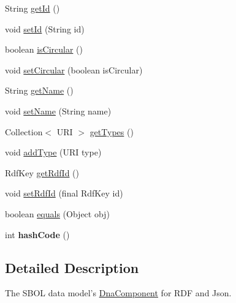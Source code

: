\begin{DoxyCompactItemize}
\item 
String \hyperlink{classorg_1_1sbolstandard_1_1lib_s_b_o_lj_1_1_dna_component_aa851daaf10426c9a42044ca1a7fe8060}{getId} ()
\item 
void \hyperlink{classorg_1_1sbolstandard_1_1lib_s_b_o_lj_1_1_dna_component_aea61027e5c308a8200c07d76d0f597b1}{setId} (String id)
\item 
boolean \hyperlink{classorg_1_1sbolstandard_1_1lib_s_b_o_lj_1_1_dna_component_ae8ce8039c52384b14ce23f816e7181d4}{isCircular} ()
\item 
void \hyperlink{classorg_1_1sbolstandard_1_1lib_s_b_o_lj_1_1_dna_component_a6534e208dd1b57a6610afb9d26eb68fa}{setCircular} (boolean isCircular)
\item 
String \hyperlink{classorg_1_1sbolstandard_1_1lib_s_b_o_lj_1_1_dna_component_acb8e59ea7c54aa9a3412564784ccaa7e}{getName} ()
\item 
void \hyperlink{classorg_1_1sbolstandard_1_1lib_s_b_o_lj_1_1_dna_component_af3da1d3c7be4ae6bd71fc20145d1db05}{setName} (String name)
\item 
Collection$<$ URI $>$ \hyperlink{classorg_1_1sbolstandard_1_1lib_s_b_o_lj_1_1_dna_component_ab7c26db2517c03db394cd08a628e1d9d}{getTypes} ()
\item 
void \hyperlink{classorg_1_1sbolstandard_1_1lib_s_b_o_lj_1_1_dna_component_a9c98ced4a045dbdf60d4c09f1025df9a}{addType} (URI type)
\item 
RdfKey \hyperlink{classorg_1_1sbolstandard_1_1lib_s_b_o_lj_1_1_dna_component_a2f954d1f82194a78433acc5f73191267}{getRdfId} ()
\item 
void \hyperlink{classorg_1_1sbolstandard_1_1lib_s_b_o_lj_1_1_dna_component_a8995b319c63119db4d42589bd2083b19}{setRdfId} (final RdfKey id)
\item 
boolean \hyperlink{classorg_1_1sbolstandard_1_1lib_s_b_o_lj_1_1_dna_component_a247353c297008cbcd2b134068c9659de}{equals} (Object obj)
\item 
\hypertarget{classorg_1_1sbolstandard_1_1lib_s_b_o_lj_1_1_dna_component_af5709fe8231fe8e8005e5a0b175e3324}{
int {\bfseries hashCode} ()}
\label{classorg_1_1sbolstandard_1_1lib_s_b_o_lj_1_1_dna_component_af5709fe8231fe8e8005e5a0b175e3324}

\end{DoxyCompactItemize}


\subsection{Detailed Description}
The SBOL data model's \hyperlink{classorg_1_1sbolstandard_1_1lib_s_b_o_lj_1_1_dna_component}{DnaComponent} for RDF and Json.

